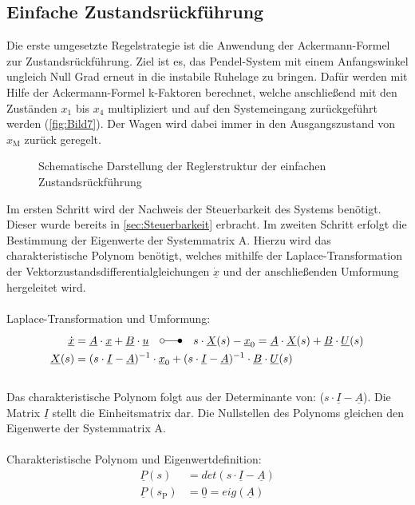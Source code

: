 \documentclass[
	pagesize,
	fontsize=12pt,
	paper=a4,
	oneside,
   reqno
]{scrartcl}
\begin{document}
\subsection{Einfache Zustandsrückführung} \label{sec:Ackermann-Formel}
Die erste umgesetzte Regelstrategie ist die Anwendung der Ackermann-Formel zur Zustandsrückführung. Ziel ist es, das Pendel-System mit einem Anfangswinkel ungleich Null Grad erneut in die instabile Ruhelage zu bringen. Dafür werden mit Hilfe der Ackermann-Formel k-Faktoren berechnet, welche anschließend mit den Zuständen $x_{\mathrm{1}}$ bis $x_{\mathrm{4}}$ multipliziert und auf den Systemeingang zurückgeführt werden (\autoref{fig:Bild7}). Der Wagen wird dabei immer in den Ausgangszustand von $x_{\mathrm{M}}$ zurück geregelt.
\begin{figure}[H]
    \centering
    \caption[Reglerstruktur Ackermann]{Schematische Darstellung der Reglerstruktur der einfachen Zustandsrückführung}
    \label{fig:Bild7}
\end{figure}
Im ersten Schritt wird der Nachweis der Steuerbarkeit des Systems benötigt. Dieser wurde bereits in \autoref{sec:Steuerbarkeit} erbracht.
Im zweiten Schritt erfolgt die Bestimmung der Eigenwerte der Systemmatrix A. Hierzu wird das charakteristische Polynom benötigt, welches mithilfe der Laplace-Transformation der Vektorzustandsdifferentialgleichungen $\underline{\dot{x}}$ und der anschließenden Umformung hergeleitet wird.\\\\
Laplace-Transformation und Umformung:
\begin{align*}
    \underline{\dot{x}} &= \underline{A}\cdot\underline{x}+\underline{B}\cdot\underline{u}\quad\laplace \quad s\cdot \underline{X}(s)-\underline{x}_{\mathrm{0}}=\underline{A}\cdot \underline{X}(s)+\underline{B}\cdot \underline{U}(s) \\
    \underline{X}(s) &= (s\cdot \underline{I} - \underline{A})^{-1}\cdot\underline{x}_{\mathrm{0}}+(s\cdot \underline{I} - \underline{A})^{-1}\cdot\underline{B}\cdot\underline{U}(s)
\end{align*}\\
Das charakteristische Polynom folgt aus der Determinante von: ($s\cdot\underline{I}-\underline{A}$). Die Matrix $\underline{I}$ stellt die Einheitsmatrix dar. Die Nullstellen des Polynoms gleichen den Eigenwerte der Systemmatrix A.\\\\
Charakteristische Polynom und Eigenwertdefinition:
\begin{align*}
    \underline{P}(s) &= det(s\cdot\underline{I}-\underline{A}) \\
    \underline{P}(s_{\mathrm{P}}) &= \underline{0} = eig(\underline{A})
\end{align*}
\end{document}
